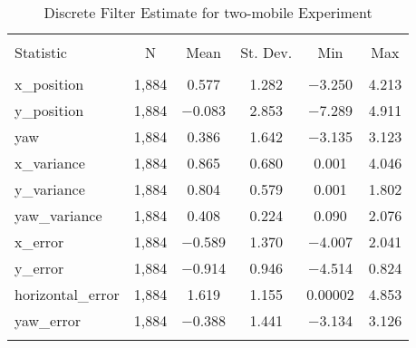 
\begin{table}[h] \centering 
  \caption{Discrete Filter Estimate for two-mobile Experiment} 
  \label{tab:two_mobile_discrete_summary} 
\begin{tabular}{@{\extracolsep{5pt}}lccccc} 
\\[-1.8ex]\hline 
\hline \\[-1.8ex] 
Statistic & \multicolumn{1}{c}{N} & \multicolumn{1}{c}{Mean} & \multicolumn{1}{c}{St. Dev.} & \multicolumn{1}{c}{Min} & \multicolumn{1}{c}{Max} \\ 
\hline \\[-1.8ex] 
x\_position & 1,884 & 0.577 & 1.282 & $-$3.250 & 4.213 \\ 
y\_position & 1,884 & $-$0.083 & 2.853 & $-$7.289 & 4.911 \\ 
yaw & 1,884 & 0.386 & 1.642 & $-$3.135 & 3.123 \\ 
x\_variance & 1,884 & 0.865 & 0.680 & 0.001 & 4.046 \\ 
y\_variance & 1,884 & 0.804 & 0.579 & 0.001 & 1.802 \\ 
yaw\_variance & 1,884 & 0.408 & 0.224 & 0.090 & 2.076 \\ 
x\_error & 1,884 & $-$0.589 & 1.370 & $-$4.007 & 2.041 \\ 
y\_error & 1,884 & $-$0.914 & 0.946 & $-$4.514 & 0.824 \\ 
horizontal\_error & 1,884 & 1.619 & 1.155 & 0.00002 & 4.853 \\ 
yaw\_error & 1,884 & $-$0.388 & 1.441 & $-$3.134 & 3.126 \\ 
\hline \\[-1.8ex] 
\end{tabular} 
\end{table} 
